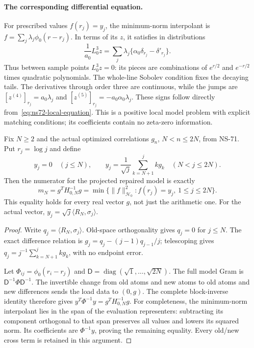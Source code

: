 \paragraph{The corresponding differential equation.}
For prescribed values $f(r_j)=y_j$, the minimum-norm interpolant is
$f=\sum_j\lambda_j\phi_0(r-r_j)$. In terms of its $z$, it satisfies
in distributions
\begin{equation}
 \frac1{a_0}L_0^3z
     =\sum_j\lambda_j\{\alpha_0\delta_{r_j}-\delta'_{r_j}\}.
 \label{eq:ns72-local-equation}
\end{equation}
Thus between sample points $L_0^3z=0$: its pieces are combinations
of $e^{r/2}$ and $e^{-r/2}$ times quadratic polynomials.
The whole-line Sobolev condition fixes the decaying tails.
The derivatives through order three are continuous, while the jumps are
$[z^{(4)}]_{r_j}=a_0\lambda_j$ and
$[z^{(5)}]_{r_j}=-a_0\alpha_0\lambda_j$.
These signs follow directly from~\eqref{eq:ns72-local-equation}.
This is a positive local model problem with explicit matching conditions;
its coefficients contain no zeta-zero information.

\begin{proposition}
\label{prop:ns72-interpolation}
Fix $N\geq2$ and the actual optimized correlations $g_n$,
$N<n\leq2N$, from NS-71. Put $r_j=\log j$ and define
\begin{equation}
 y_j=0\quad(j\leq N),\qquad
 y_j=\frac1{\sqrt j}\sum_{k=N+1}^j k g_k\quad(N<j\leq2N).
 \label{eq:ns72-data}
\end{equation}
Then the numerator for the projected repaired model is exactly
\begin{equation}
 m_N=g^TH_{0,N}^{-1}g
       =\min\{\|f\|_{\mathcal H_0}^2:
                          f(r_j)=y_j,\ 1\leq j\leq2N\}.
 \label{eq:ns72-interpolation-numerator}
\end{equation}
This equality holds for every real vector $g$, not just the arithmetic one.
For the actual vector, $y_j=\sqrt j\langle R_N,\sigma_j\rangle$.
\end{proposition}
\begin{proof}
Write $q_j=\langle R_N,\sigma_j\rangle$.
Old-space orthogonality gives $q_j=0$ for $j\leq N$.
The exact difference relation is
$g_j=q_j-(j-1)q_{j-1}/j$; telescoping gives
$q_j=j^{-1}\sum_{k=N+1}^jkg_k$, with no endpoint error.

Let $\Phi_{ij}=\phi_0(r_i-r_j)$ and
$\mathsf D=\operatorname{diag}(\sqrt1,\ldots,\sqrt{2N})$.
The full model Gram is $\mathsf D^{-1}\Phi\mathsf D^{-1}$.
The invertible change from old atoms and new atoms to old atoms and
new differences sends the load data to $(0,g)$.
The complete block-inverse identity therefore gives
$y^T\Phi^{-1}y=g^TH_{0,N}^{-1}g$.
For completeness, the minimum-norm interpolant lies in the span of
the evaluation representers: subtracting its component orthogonal to
that span preserves all values and lowers its squared norm.
Its coefficients are $\Phi^{-1}y$, proving the remaining equality.
Every old/new cross term is retained in this argument.
\end{proof}

